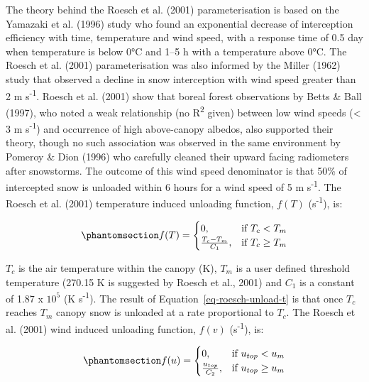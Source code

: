 \documentclass[
  letterpaper,
]{tex/uofsthesis-cs}
\begin{document}
The theory behind the Roesch et al. (2001) parameterisation is based on
the Yamazaki et al. (1996) study who found an exponential decrease of
interception efficiency with time, temperature and wind speed, with a
response time of 0.5 day when temperature is below 0°C and 1--5 h with a
temperature above 0°C. The Roesch et al. (2001) parameterisation was
also informed by the Miller (1962) study that observed a decline in snow
interception with wind speed greater than 2 m s\textsuperscript{-1}.
Roesch et al. (2001) show that boreal forest observations by Betts \&
Ball (1997), who noted a weak relationship (no R\textsuperscript{2}
given) between low wind speeds (\textless{} 3 m s\textsuperscript{-1})
and occurrence of high above-canopy albedos, also supported their
theory, though no such association was observed in the same environment
by Pomeroy \& Dion (1996) who carefully cleaned their upward facing
radiometers after snowstorms. The outcome of this wind speed denominator
is that 50\% of intercepted snow is unloaded within 6 hours for a wind
speed of 5 m s\textsuperscript{-1}. The Roesch et al. (2001) temperature
induced unloading function, \(f(T)\) (s\textsuperscript{-1}), is:

\begin{equation}\phantomsection\label{eq-roesch-unload-t}{
f(T) = \begin{cases}
    0,& \text{if } T_c < T_m \\
    \frac{T_c - T_m}{C_1},              & \text{if }  T_c \ge T_m
\end{cases}
}\end{equation}

\(T_c\) is the air temperature within the canopy (K), \(T_m\) is a user
defined threshold temperature (270.15 K is suggested by Roesch et al.,
2001) and \(C_1\) is a constant of 1.87 x \(10^5\) (K
s\textsuperscript{-1}). The result of Equation~\ref{eq-roesch-unload-t}
is that once \(T_c\) reaches \(T_m\) canopy snow is unloaded at a rate
proportional to \(T_c\). The Roesch et al. (2001) wind induced unloading
function, \(f(v)\) (s\textsuperscript{-1}), is:

\begin{equation}\phantomsection\label{eq-roesch-unload-v}{
f(u) = \begin{cases}
    0,& \text{if } u_{top} < u_m \\
    \frac{u_{top}}{C_2},              & \text{if }  u_{top} \ge u_m
\end{cases}
}\end{equation}
\end{document}
